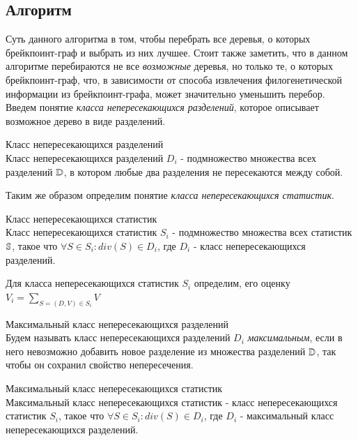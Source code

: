 \subsection{Алгоритм }
Суть данного алгоритма в том, чтобы перебрать все деревья, о которых  брейкпоинт-граф и выбрать из них лучшее.
Стоит также заметить, что в данном алгоритме перебираются не все \emph{возможные} деревья, но только те, о которых  брейкпоинт-граф,
что, в зависимости от способа извлечения филогенетической информации из брейкпоинт-графа, может значительно уменьшить перебор.
Введем понятие \textit{класса непересекающихся разделений}, которое описывает возможное дерево в виде разделений.
\begin{define}{Класс непересекающихся разделений} \\
  Класс непересекающихся разделений $D_i$ - подмножество множества всех разделений $\mathbb{D}$,
  в котором любые два разделения не пересекаются между собой.
\end{define}

Таким же образом определим понятие \textit{класса непересекающихся статистик}.
\begin{define}{Класс непересекающихся статистик}\\
  Класс непересекающихся статистик $S_i$ - подмножество множества всех статистик $\mathbb{S}$,
  такое что $\forall S \in S_i: div(S) \in D_i$,
  где $D_i$ -  класс непересекающихся разделений.
\end{define}

Для класса непересекающихся статистик $S_i$ определим, его оценку $V_i = \sum\limits_{S = (D, V) \in S_i} V$

\begin{define}{Максимальный класс непересекающихся разделений} \\
  Будем называть класс непересекающихся разделений $D_i$ \textit{максимальным},
  если в него невозможно добавить новое разделение из множества разделений $\mathbb{D}$,
  так чтобы он сохранил свойство непересечения.
\end{define}

\begin{define}{Максимальный класс непересекающихся статистик} \\
  Максимальный класс непересекающихся статистик - класс непересекающихся статистик $S_i$,
  такое что $\forall S \in S_i: div(S) \in D_i$,
  где $D_i$ - максимальный класс непересекающихся разделений.
\end{define}


